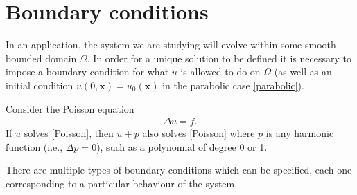 \documentclass[
    a4paper,
    DIV=14,
    abstract=true,
    numbers=noenddot
]{scrartcl}
\begin{document}
\section{Boundary conditions}\label{boundary sec}
In an application, the system we are studying will evolve within some smooth bounded domain $\Omega$. In order for a unique solution to be defined it is necessary to impose a boundary condition for what $u$ is allowed to do on  $\Omega$ (as well as an initial condition $u(0,\bm{x})=u_0(\bm{x})$ in the parabolic case \eqref{parabolic}).
\begin{example}
	Consider the Poisson equation
	\begin{align}\label{Poisson}
		\Delta u=f.
	\end{align}
	If $u$ solves \eqref{Poisson}, then $u+p$ also solves \eqref{Poisson} where $p$ is any harmonic function (i.e., $\Delta p = 0$), such as a polynomial of degree 0 or 1.
\end{example}
There are multiple types of boundary conditions which can be specified, each one corresponding to a particular behaviour of the system.
\end{document}
